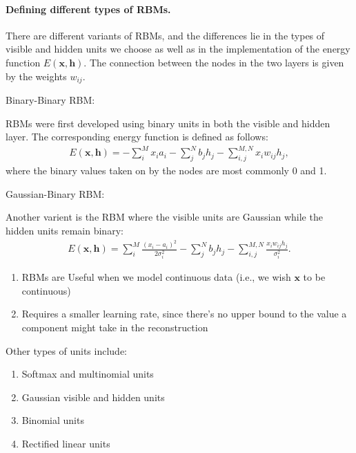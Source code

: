 \documentclass[%
oneside,                 %
final,                   %
10pt]{article}
\begin{document}
\paragraph{Defining different types of RBMs.}
There are different variants of RBMs, and the differences lie in the types of visible and hidden units we choose as well as in the implementation of the energy function $E(\mathbf{x},\mathbf{h})$. The connection between the nodes in the two layers is given by the weights $w_{ij}$. 

 Binary-Binary RBM:

RBMs were first developed using binary units in both the visible and hidden layer. The corresponding energy function is defined as follows:
\begin{align}
	E(\mathbf{x}, \mathbf{h}) = - \sum_i^M x_i a_i- \sum_j^N b_j h_j - \sum_{i,j}^{M,N} x_i w_{ij} h_j,
\end{align}
where the binary values taken on by the nodes are most commonly 0 and 1.

 Gaussian-Binary RBM:

Another varient is the RBM where the visible units are Gaussian while the hidden units remain binary:
\begin{align}
	E(\mathbf{x}, \mathbf{h}) = \sum_i^M \frac{(x_i - a_i)^2}{2\sigma_i^2} - \sum_j^N b_j h_j - \sum_{i,j}^{M,N} \frac{x_i w_{ij} h_j}{\sigma_i^2}. 
\end{align}

\begin{enumerate}
\item RBMs are Useful when we model continuous data (i.e., we wish $\mathbf{x}$ to be continuous)

\item Requires a smaller learning rate, since there's no upper bound to the value a component might take in the reconstruction
\end{enumerate}

\noindent
Other types of units include:
\begin{enumerate}
\item Softmax and multinomial units

\item Gaussian visible and hidden units

\item Binomial units

\item Rectified linear units
\end{enumerate}
\end{document}
